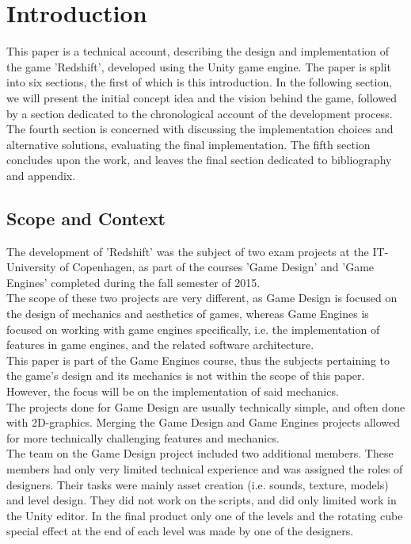 \section{Introduction}
 This paper is a technical account, describing the design and implementation of the game 'Redshift', developed using the Unity game engine. The paper is split into six sections, the first of which is this introduction. In the following section, we will present the initial concept idea and the vision behind the game, followed by a section dedicated to the chronological account of the development process. The fourth section is concerned with discussing the implementation choices and alternative solutions, evaluating the final implementation. The fifth section concludes upon the work, and leaves the final section dedicated to bibliography and appendix.
 
\subsection{Scope and Context}
The development of 'Redshift' was the subject of two exam projects at the IT-University of Copenhagen, as part of the courses 'Game Design' and 'Game Engines' completed during the fall semester of 2015.\\

The scope of these two projects are very different, as Game Design is focused on the design of mechanics and aesthetics of games, whereas Game Engines is focused on working with game engines specifically, i.e. the implementation of features in game engines, and the related software architecture.\\

This paper is part of the Game Engines course, thus the subjects pertaining to the game's design and its mechanics is not within the scope of this paper. However, the focus will be on the implementation of said mechanics.\\

The projects done for Game Design are usually technically simple, and often done with 2D-graphics. Merging the Game Design and Game Engines projects allowed for more technically challenging features and mechanics.\\

The team on the Game Design project included two additional members. These members had only very limited technical experience and was assigned the roles of designers. Their tasks were mainly asset creation (i.e. sounds, texture, models) and level design. They did not work on the scripts, and did only limited work in the Unity editor. In the final product only one of the levels and the rotating cube special effect at the end of each level was made by one of the designers.



